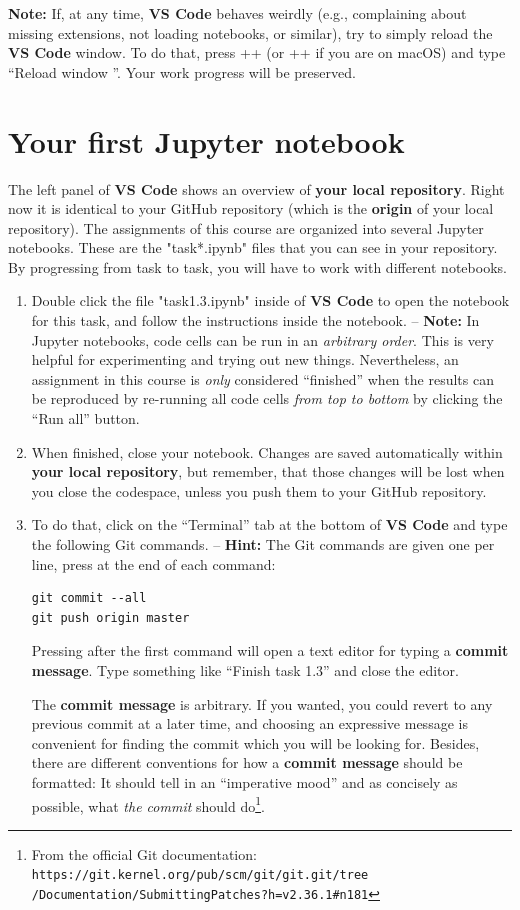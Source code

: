 \documentclass[12pt,a4paper]{article}
\begin{document}
\textbf{Note:} If, at any time, \textbf{VS Code} behaves weirdly (e.g., complaining about missing extensions, not loading notebooks, or similar), try to simply reload the \textbf{VS Code} window. To do that, press \Ctrl+\keystroke{\shift}+ (or \keystroke{\cmd}+\keystroke{\shift}+ if you are on macOS) and type ``Reload window \Return''. Your work progress will be preserved.

\section{Your first Jupyter notebook}
The left panel of \textbf{VS Code} shows an overview of \textbf{your local repository}. Right now it is identical to your GitHub repository (which is the \textbf{origin} of your local repository). The assignments of this course are organized into several Jupyter notebooks. These are the "task*.ipynb" files that you can see in your repository. By progressing from task to task, you will have to work with different notebooks.

\begin{enumerate}
\item Double click the file "task1.3.ipynb" inside of \textbf{VS Code} to open the notebook for this task, and follow the instructions inside the notebook. -- \textbf{Note:} In Jupyter notebooks, code cells can be run in an \emph{arbitrary order}. This is very helpful for experimenting and trying out new things. Nevertheless, an assignment in this course is \emph{only} considered ``finished'' when the results can be reproduced by re-running all code cells \emph{from top to bottom} by clicking the ``Run all'' button.
\item When finished, close your notebook. Changes are saved automatically within \textbf{your local repository}, but remember, that those changes will be lost when you close the codespace, unless you push them to your GitHub repository.
\item To do that, click on the ``Terminal'' tab at the bottom of \textbf{VS Code} and type the following Git commands. -- \textbf{Hint:} The Git commands are given one per line, press \Return at the end of each command:
\begin{Verbatim}[frame=single]
git commit --all
git push origin master
\end{Verbatim}
Pressing \Return after the first command will open a text editor for typing a \textbf{commit message}. Type something like ``Finish task 1.3'' and close the editor.

The \textbf{commit message} is arbitrary. If you wanted, you could revert to any previous commit at a later time, and choosing an expressive message is convenient for finding the commit which you will be looking for. Besides, there are different conventions for how a \textbf{commit message} should be formatted: It should tell in an ``imperative mood'' and as concisely as possible, what \emph{the commit} should do\footnote{From the official Git documentation: \texttt{https://git.kernel.org/pub/scm/git/git.git/tree\\/Documentation/SubmittingPatches?h=v2.36.1\#n181}}.
\end{enumerate}
\end{document}
